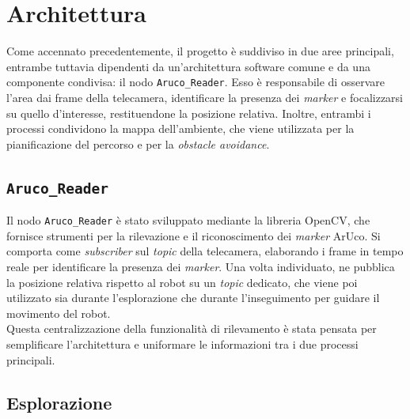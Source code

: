 \documentclass[12pt]{article}
\begin{document}
\section{Architettura}
Come accennato precedentemente, il progetto è suddiviso in due aree principali, entrambe tuttavia dipendenti da un'architettura software comune e da una componente condivisa: il nodo \texttt{Aruco\_Reader}. Esso è responsabile di osservare l'area dai frame della telecamera, identificare la presenza dei \textit{marker} e focalizzarsi su quello d'interesse, restituendone la posizione relativa. Inoltre, entrambi i processi condividono la mappa dell'ambiente, che viene utilizzata per la pianificazione del percorso e per la \textit{obstacle avoidance}.
\subsection{\texttt{Aruco\_Reader}}
Il nodo \texttt{Aruco\_Reader} è stato sviluppato mediante la libreria OpenCV, che fornisce strumenti per la rilevazione e il riconoscimento dei \textit{marker} ArUco. Si comporta come \textit{subscriber} sul \textit{topic} della telecamera, elaborando i frame in tempo reale per identificare la presenza dei \textit{marker}. Una volta individuato, ne pubblica la posizione relativa rispetto al robot su un \textit{topic} dedicato, che viene poi utilizzato sia durante l'esplorazione che durante l'inseguimento per guidare il movimento del robot.
\\[1em]
Questa centralizzazione della funzionalità di rilevamento è stata pensata per semplificare l'architettura e uniformare le informazioni tra i due processi principali.
\subsection{Esplorazione}
\end{document}
